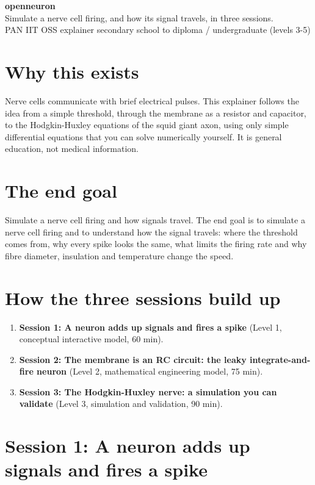 \documentclass[11pt,a4paper]{article}
\begin{document}
\begin{center}{\LARGE\bfseries openneuron}\\[0.4em]{\large Simulate a nerve cell firing, and how its signal travels, in three sessions.}\\[0.2em]\small PAN IIT OSS explainer \textbullet{} secondary school to diploma / undergraduate (levels 3-5)\end{center}

\section*{Why this exists}
Nerve cells communicate with brief electrical pulses. This explainer follows the idea from a simple threshold, through the membrane as a resistor and capacitor, to the Hodgkin-Huxley equations of the squid giant axon, using only simple differential equations that you can solve numerically yourself. It is general education, not medical information.

\section*{The end goal}
Simulate a nerve cell firing and how signals travel. The end goal is to simulate a nerve cell firing and to understand how the signal travels: where the threshold comes from, why every spike looks the same, what limits the firing rate and why fibre diameter, insulation and temperature change the speed.

\section*{How the three sessions build up}
\begin{enumerate}[nosep]
\item \textbf{Session 1: A neuron adds up signals and fires a spike} (Level 1, conceptual interactive model, 60 min).
\item \textbf{Session 2: The membrane is an RC circuit: the leaky integrate-and-fire neuron} (Level 2, mathematical engineering model, 75 min).
\item \textbf{Session 3: The Hodgkin-Huxley nerve: a simulation you can validate} (Level 3, simulation and validation, 90 min).
\end{enumerate}

\section{Session 1: A neuron adds up signals and fires a spike}
\end{document}
